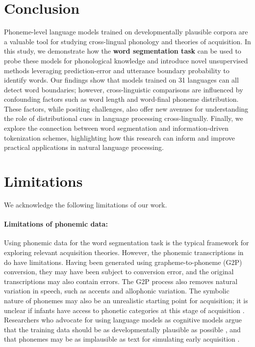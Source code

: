 

\section{Conclusion}

Phoneme-level language models trained on developmentally plausible corpora are a valuable tool for studying cross-lingual phonology and theories of acquisition. In this study, we demonstrate how the \textbf{word segmentation task} can be used to probe these models for phonological knowledge and introduce novel unsupervised methods leveraging prediction-error and utterance boundary probability to identify words. Our findings show that models trained on 31 languages can all detect word boundaries; however, cross-linguistic comparisons are influenced by confounding factors such as word length and word-final phoneme distribution. These factors, while positing challenges, also offer new avenues for understanding the role of distributional cues in language processing cross-lingually. Finally, we explore the connection between word segmentation and information-driven tokenization schemes, highlighting how this research can inform and improve practical applications in natural language processing.

\section{Limitations}\label{app:15-limitations}

We acknowledge the following limitations of our work.

\paragraph{Limitations of phonemic data:} Using phonemic data for the word segmentation task is the typical framework for exploring relevant acquisition theories. However, the phonemic transcriptions in \ipachildes do have limitations. Having been generated using grapheme-to-phoneme (G2P) conversion, they may have been subject to conversion error, and the original transcriptions may also contain errors. The G2P process also removes natural variation in speech, such as accents and allophonic variation. The symbolic nature of phonemes may also be an unrealistic starting point for acquisition; it is unclear if infants have access to phonetic categories at this stage of acquisition \citep{feldman_infants_2021, mcmurray_myth_2022}. Researchers who advocate for using language models as cognitive models argue that the training data should be as developmentally plausible as possible \citep{dupoux-2018-cognitive, warstadt-2022-artificial}, and that phonemes may be as implausible as text for simulating early acquisition \citep{lavechin}.

